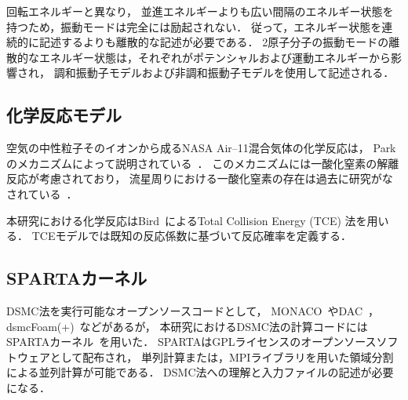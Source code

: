 回転エネルギーと異なり，
並進エネルギーよりも広い間隔のエネルギー状態を持つため，振動モードは完全には励起されない．
従って，エネルギー状態を連続的に記述するよりも離散的な記述が必要である．
2原子分子の振動モードの離散的なエネルギー状態は，それぞれがポテンシャルおよび運動エネルギーから影響され，
調和振動子モデルおよび非調和振動子モデルを使用して記述される．

\subsection{化学反応モデル}
空気の中性粒子そのイオンから成るNASA Air–11混合気体の化学反応は，
Parkのメカニズムによって説明されている~\cite{park1993review,park2001chemical}．
このメカニズムには一酸化窒素の解離反応が考慮されており，
流星周りにおける一酸化窒素の存在は過去に研究がなされている~\cite{menees1976nitric,park1978odd,silber2018nitric}．

本研究における化学反応はBird~\cite{bird1994molecular}によるTotal Collision Energy (TCE) 法を用いる．
TCEモデルでは既知の反応係数に基づいて反応確率を定義する．

%

\subsection{SPARTAカーネル}
DSMC法を実行可能なオープンソースコードとして，
MONACO~\cite{padilla2010comparison}やDAC~\cite{padilla2010comparison}，dsmcFoam(+)~\cite{scanlon2010open,white2018dsmcfoam+,raeisi2019numerical}などがあるが，
本研究におけるDSMC法の計算コードにはSPARTAカーネル~\cite{spartaWWW,bariselli2020aerothermodynamic,plimpton2019direct}を用いた．
SPARTAはGPLライセンスのオープンソースソフトウェアとして配布され，
単列計算または，MPIライブラリを用いた領域分割による並列計算が可能である．
DSMC法への理解と入力ファイルの記述が必要になる．

